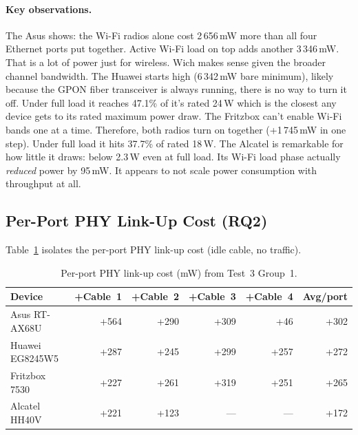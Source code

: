 \paragraph{Key observations.}
The Asus shows: the Wi-Fi radios alone cost 2\,656\,mW more than all four Ethernet ports put together. Active Wi-Fi load on top adds another 3\,346\,mW. That is a lot of power just for wireless. Wich makes sense given the broader channel bandwidth.
The Huawei starts high (6\,342\,mW bare minimum), likely because the GPON fiber transceiver is always running, there is no way to turn it off. Under full load it reaches 47.1\% of it's rated 24\,W which is the closest any device gets to its rated maximum power draw.
The Fritzbox can't enable Wi-Fi bands one at a time. Therefore, both radios turn on together (+1\,745\,mW in one step). Under full load it hits 37.7\% of rated 18\,W.
The Alcatel is remarkable for how little it draws: below 2.3\,W even at full load. Its Wi-Fi load phase actually \emph{reduced} power by 95\,mW. It appears to not scale power consumption with throughput at all.

\subsection{Per-Port PHY Link-Up Cost (RQ2)}
\label{sec:test3-rq2}

Table~\ref{tab:test3_per_port} isolates the per-port \ac{PHY} link-up cost (idle cable, no traffic).

\begin{table}[H]
    \centering
    \caption{Per-port PHY link-up cost (mW) from Test~3 Group~1.}
    \label{tab:test3_per_port}
    \small\renewcommand{\arraystretch}{0.88}
    \begin{tabular}{l r r r r r}
        \toprule
        \textbf{Device} & \textbf{+Cable~1} & \textbf{+Cable~2} & \textbf{+Cable~3} & \textbf{+Cable~4} & \textbf{Avg/port} \\
        \midrule
        Asus RT-AX68U    & +564 & +290 & +309 & +46  & +302 \\
        Huawei EG8245W5  & +287 & +245 & +299 & +257 & +272 \\
        Fritzbox 7530    & +227 & +261 & +319 & +251 & +265 \\
        Alcatel HH40V    & +221 & +123 & ---  & ---  & +172 \\
        \bottomrule
    \end{tabular}
\end{table}

